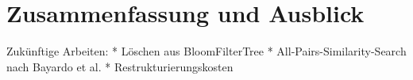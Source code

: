 \chapter{Zusammenfassung und Ausblick}\label{ch:zusammenfassung}

Zukünftige Arbeiten: 
* Löschen aus BloomFilterTree
* All-Pairs-Similarity-Search nach Bayardo et al. 
* Restrukturierungskosten 